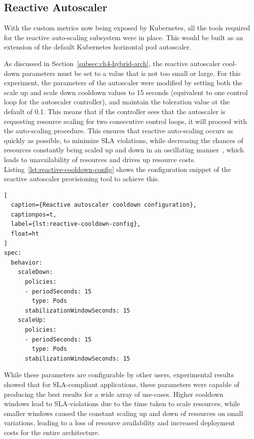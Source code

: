 \subsection{Reactive Autoscaler}
\label{subsec:reactive-auto-subsection}

With the custom metrics now being exposed by Kubernetes, all the tools required for the reactive auto-scaling subsystem were in place. This would be built as an extension of the default Kubernetes horizontal pod autoscaler.\par

As discussed in Section~\ref{subsec:ch4-hybrid-arch}, the reactive autoscaler cool-down parameters must be set to a value that is not too small or large. For this experiment, the parameters of the autoscaler were modified by setting both the scale up and scale down cooldown values to 15 seconds (equivalent to one control loop for the autoscaler controller), and maintain the toleration value at the default of 0.1. This means that if the controller sees that the autoscaler is requesting resource scaling for two consecutive control loops, it will proceed with the auto-scaling procedure. This ensures that reactive auto-scaling occurs as quickly as possible, to minimize SLA violations, while decreasing the chances of resources constantly being scaled up and down in an oscillating manner~\cite{sides2015yo}, which leads to unavailability of resources and drives up resource costs. Listing~\ref{lst:reactive-cooldown-config} shows the configuration snippet of the reactive autoscaler provisioning tool to achieve this.\par

\begin{lstlisting}[
  caption={Reactive autoscaler cooldown configuration},
  captionpos=t,
  label={lst:reactive-cooldown-config},
  float=ht
]
spec:
  behavior:
    scaleDown:
      policies:
      - periodSeconds: 15
        type: Pods
      stabilizationWindowSeconds: 15
    scaleUp:
      policies:
      - periodSeconds: 15
        type: Pods
      stabilizationWindowSeconds: 15
\end{lstlisting}

While these parameters are configurable by other users, experimental results showed that for SLA-compliant applications, these parameters were capable of producing the best results for a wide array of use-cases. Higher cooldown windows lead to SLA-violations due to the time taken to scale resources, while smaller windows caused the constant scaling up and down of resources on small variations, leading to a loss of resource availability and increased deployment costs for the entire architecture.

